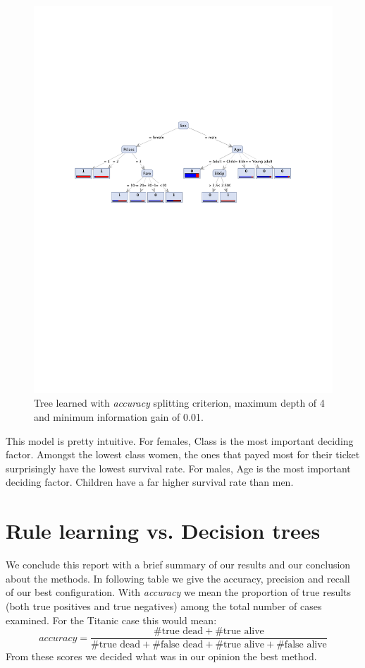 \documentclass[12pt,a4paper]{article}
\begin{document}
\begin{figure}[htbp]
  \centering
  \includegraphics[width = .8\textwidth]{tree_final}
  \captionsetup{width=.8\textwidth}
  \caption{Tree learned with \emph{accuracy} splitting criterion, maximum depth of 4 and minimum information gain of 0.01.}
  \label{fig:tree_final}
\end{figure}
\par This model is pretty intuitive. For females, Class is the most important deciding factor. Amongst the lowest class women, the ones that payed most for their ticket surprisingly have the lowest survival rate. For males, Age is the most important deciding factor. Children have a far higher survival rate than men.
\pagebreak
\section{Rule learning vs. Decision trees}

We conclude this report with a brief summary of our results and our conclusion about the methods.
In following table we give the accuracy, precision and recall of our best configuration.
With \emph{accuracy} we mean the proportion of true results (both true positives and true negatives) among the total number of cases examined.
For the Titanic case this would mean:
$$accuracy = \frac{\#\text{true dead} + \#\text{true alive} }{\#\text{true dead} + \#\text{false dead} + \#\text{true alive} + \#\text{false alive}}$$
From these scores we decided what was in our opinion the best method.
\end{document}
